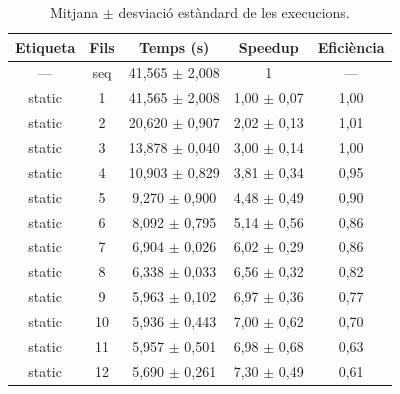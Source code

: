 \begin{table}[H]
\centering
\begin{tabular}{|c|c|c|c|c|}
\hline
\textbf{Etiqueta} & \textbf{Fils} & \textbf{Temps (s)} & \textbf{Speedup} & \textbf{Eficiència} \\ \hline
--- & seq & 41,565 $\pm$ 2,008 & 1 & --- \\ \hline
static & 1 & 41,565 $\pm$ 2,008 & 1,00 $\pm$ 0,07 & 1,00 \\ \hline
static & 2 & 20,620 $\pm$ 0,907 & 2,02 $\pm$ 0,13 & 1,01 \\ \hline
static & 3 & 13,878 $\pm$ 0,040 & 3,00 $\pm$ 0,14 & 1,00 \\ \hline
static & 4 & 10,903 $\pm$ 0,829 & 3,81 $\pm$ 0,34 & 0,95 \\ \hline
static & 5 & 9,270 $\pm$ 0,900 & 4,48 $\pm$ 0,49 & 0,90 \\ \hline
static & 6 & 8,092 $\pm$ 0,795 & 5,14 $\pm$ 0,56 & 0,86 \\ \hline
static & 7 & 6,904 $\pm$ 0,026 & 6,02 $\pm$ 0,29 & 0,86 \\ \hline
static & 8 & 6,338 $\pm$ 0,033 & 6,56 $\pm$ 0,32 & 0,82 \\ \hline
static & 9 & 5,963 $\pm$ 0,102 & 6,97 $\pm$ 0,36 & 0,77 \\ \hline
static & 10 & 5,936 $\pm$ 0,443 & 7,00 $\pm$ 0,62 & 0,70 \\ \hline
static & 11 & 5,957 $\pm$ 0,501 & 6,98 $\pm$ 0,68 & 0,63 \\ \hline
static & 12 & 5,690 $\pm$ 0,261 & 7,30 $\pm$ 0,49 & 0,61 \\ \hline
\end{tabular}
\caption{Mitjana $\pm$ desviació estàndard de les execucions.}
\label{tab:resultats}
\end{table}
